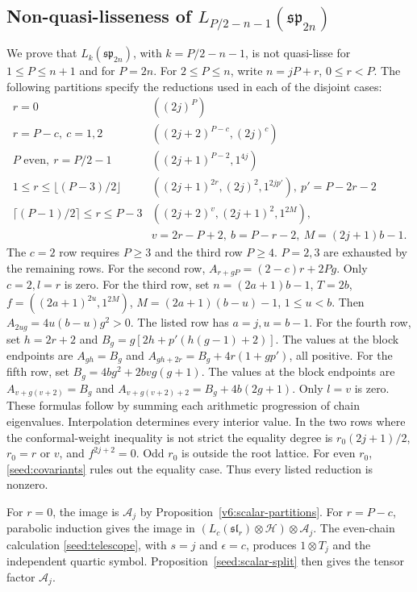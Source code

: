 \documentclass[11pt,a4paper]{amsart}
\numberwithin{equation}{section}
\theoremstyle{definition}
\theoremstyle{remark}
\newcommand{\spg}{\mathfrak{sp}}
\newcommand{\slg}{\mathfrak{sl}}
\begin{document}
\subsection{\texorpdfstring{Non-quasi-lisseness of $L_{P/2-n-1}(\spg_{2n})$}{Non-quasi-lisseness of L(P/2-n-1)(sp(2n))}}\label{sec:C-exclusions}
We prove that $L_k(\spg_{2n})$, with $k=P/2-n-1$, is not quasi-lisse
for $1\le P\le n+1$ and for $P=2n$.
For $2\le P\le n$, write $n=jP+r$, $0\le r<P$. The following
partitions specify the reductions used in each of the disjoint cases:
\begin{equation}\label{seed:C-negative-list}
\begin{array}{c|l}
r=0&((2j)^P)\\
r=P-c,\ c=1,2&((2j+2)^{P-c},(2j)^c)\\
P\text{ even},\ r=P/2-1&((2j+1)^{P-2},1^{4j})\\
1\le r\le\lfloor(P-3)/2\rfloor&
 ((2j+1)^{2r},(2j)^2,1^{2jp'}),\ p'=P-2r-2\\
\lceil(P-1)/2\rceil\le r\le P-3&
 ((2j+2)^v,(2j+1)^2,1^{2M}),\\
 &v=2r-P+2,\ b=P-r-2,\ M=(2j+1)b-1.
\end{array}
\end{equation}
The $c=2$ row requires $P\ge3$ and the third row $P\ge4$.
$P=2,3$ are exhausted by the remaining rows.
For the second row,
$A_{r+gP}=(2-c)r+2Pg$. Only $c=2,l=r$ is zero.
For the third row, set $n=(2a+1)b-1$, $T=2b$,
$f=((2a+1)^{2u},1^{2M})$, $M=(2a+1)(b-u)-1$, $1\le u<b$.
Then $A_{2ug}=4u(b-u)g^2>0$. The listed row has $a=j,u=b-1$.
For the fourth row, set $h=2r+2$ and
$B_g=g[2h+p'(h(g-1)+2)]$. The values at the block endpoints are
$A_{gh}=B_g$ and $A_{gh+2r}=B_g+4r(1+gp')$, all positive.
For the fifth row, set $B_g=4bg^2+2bvg(g+1)$. The values at the block endpoints are
$A_{v+g(v+2)}=B_g$ and
$A_{v+g(v+2)+2}=B_g+4b(2g+1)$. Only $l=v$ is zero.
These formulas follow by summing each arithmetic progression of chain
eigenvalues. Interpolation determines every interior value.
In the two rows where the conformal-weight inequality is not strict the equality degree is $r_0(2j+1)/2$,
$r_0=r$ or $v$, and $f^{2j+2}=0$. Odd $r_0$ is outside the root
lattice. For even $r_0$, \cref{seed:covariants} rules out the equality case.
Thus every listed reduction is nonzero.

For $r=0$, the image is $\mathcal A_j$ by Proposition~\ref{v6:scalar-partitions}.
For $r=P-c$, parabolic induction gives the image in
$(L_c(\slg_r)\otimes\mathcal H)\otimes\mathcal A_j$.
The even-chain calculation \eqref{seed:telescope}, with $s=j$ and
$\epsilon=c$, produces $1\otimes T_j$ and the independent quartic
symbol. Proposition~\ref{seed:scalar-split} then gives the tensor
factor $\mathcal A_j$.
\end{document}
